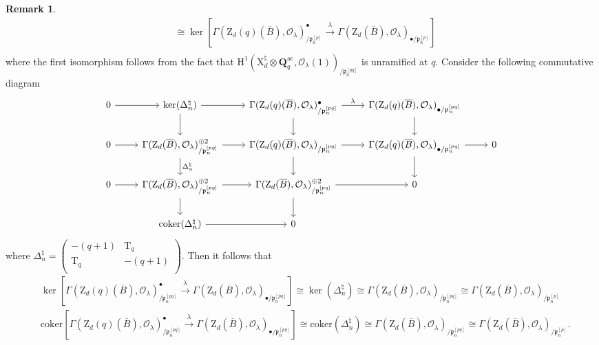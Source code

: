 \documentclass[10pt]{amsart}
\numberwithin{equation}{section}
\theoremstyle{plain}
\numberwithin{equation}{section}
\theoremstyle{definition}
\newtheorem{remark}[equation]{Remark}
\theoremstyle{remark}
\def\coker{\mathrm{coker}}
\def\ac{\mathrm{ac}}
\def\ac{\mathrm{ac}}
\def\calO{\mathcal{O}}
\def\frakp{\mathfrak{p}}
\def\QQ{\mathbf{Q}}
\def\rmH{\mathrm{H}}
\def\rmX{\mathrm{X}}
\def\rmT{\mathrm{T}}
\def\rmZ{\mathrm{Z}}
\begin{document}
\begin{remark}
\begin{equation*}
\begin{aligned}
&\cong \ker[\Gamma(\rmZ_{d}(q)(\overline{B}), \calO_{\lambda})^{\bullet}_{/\frakp^{[p]}_{n}}\xrightarrow{\lambda}\Gamma(\rmZ_{d}(\overline{B}), \calO_{\lambda})_{\bullet/\frakp^{[p]}_{n}}]\\
\end{aligned}
\end{equation*}
where the first isomorphism follows from the fact that $\rmH^{1}(\rmX^{\natural}_{d}\otimes{\QQ^{\ac}_{q}}, \calO_{\lambda}(1))_{/\frakp^{[pq]}_{n}}$ is unramified at $q$. Consider the following commutative diagram
\begin{equation*}
\begin{tikzcd}
0 \arrow[r] & \ker(\Delta^{\natural}_{n}) \arrow[d] \arrow[r] & \Gamma(\rmZ_{d}(q)(\overline{B}), \calO_{\lambda})^{\bullet}_{/\frakp^{[pq]}_{n}} \arrow[d] \arrow[r, "\lambda"] & \Gamma(\rmZ_{d}(q)(\overline{B}), \calO_{\lambda})_{\bullet/\frakp^{[pq]}_{n}} \arrow[d]           &   \\
0 \arrow[r] & \Gamma(\rmZ_{d}(\overline{B}), \calO_{\lambda})^{\oplus2}_{/\frakp^{[pq]}_{n}} \arrow[r] \arrow[d, "\Delta^{\natural}_{n}"] & \Gamma(\rmZ_{d}(q)(\overline{B}), \calO_{\lambda})_{/\frakp^{[pq]}_{n}} \arrow[r] \arrow[d] & \Gamma(\rmZ_{d}(q)(\overline{B}), \calO_{\lambda})_{\bullet/\frakp^{[pq]}_{n}}\arrow[r] \arrow[d] & 0 \\
0 \arrow[r] & \Gamma(\rmZ_{d}(\overline{B}), \calO_{\lambda})^{\oplus2}_{/\frakp^{[pq]}_{n}} \arrow[r] \arrow[d] & \Gamma(\rmZ_{d}(\overline{B}), \calO_{\lambda})^{\oplus2}_{/\frakp^{[pq]}_{n}}  \arrow[r] \arrow[d] & 0                     &   \\
            & \coker(\Delta^{\natural}_{n}) \arrow[r]           & 0                     &                       &  
\end{tikzcd}
\end{equation*}
where $\Delta^{\natural}_{n}=\begin{pmatrix}-(q+1) &   \rmT_{q}\\\rmT_{q} & -(q+1)\\ \end{pmatrix}$.  Then it follows that 
\begin{equation*}\label{fil-quot-drinfeld}
\begin{aligned}
&\ker[\Gamma(\rmZ_{d}(q)(\overline{B}), \calO_{\lambda})^{\bullet}_{/\frakp^{[pq]}_{n}}\xrightarrow{\lambda}\Gamma(\rmZ_{d}(\overline{B}), \calO_{\lambda})_{\bullet/\frakp^{[pq]}_{n}}]\cong \ker(\Delta^{\natural}_{n})\cong \Gamma(\rmZ_{d}(\overline{B}), \calO_{\lambda})_{/\frakp^{[pq]}_{n}}\cong \Gamma(\rmZ_{d}(\overline{B}), \calO_{\lambda})_{/\frakp^{[p]}_{n}}\\
&\coker[\Gamma(\rmZ_{d}(q)(\overline{B}), \calO_{\lambda})^{\bullet}_{/\frakp^{[pq]}_{n}}\xrightarrow{\lambda}\Gamma(\rmZ_{d}(\overline{B}), \calO_{\lambda})_{\bullet/\frakp^{[pq]}_{n}}]\cong \coker(\Delta^{\natural}_{n})\cong \Gamma(\rmZ_{d}(\overline{B}), \calO_{\lambda})_{/\frakp^{[pq]}_{n}}\cong \Gamma(\rmZ_{d}(\overline{B}), \calO_{\lambda})_{/\frakp^{[p]}_{n}}.\\
\end{aligned}
\end{equation*}


\end{remark}
\end{document}
